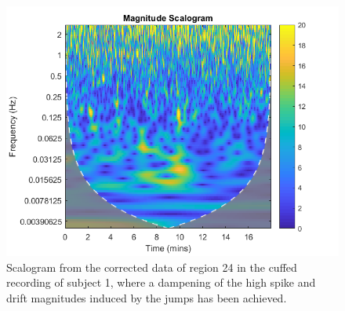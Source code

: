 \begin{figure}[H]
	\includegraphics[width=1\textwidth]{figures/uncuffed_sub3_roi8_corr}
	\caption{Scalogram from the corrected data of region 24 in the cuffed recording of subject 1, where a dampening of the high spike and drift magnitudes induced by the jumps has been achieved.}
	\label{fig:scalogram_corr}
\end{figure} 